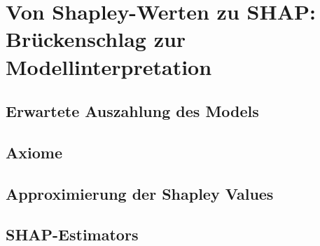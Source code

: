 \chapter{Von Shapley-Werten zu \acs{SHAP}: Brückenschlag zur Modellinterpretation}

\section{Erwartete Auszahlung des Models}
\section{Axiome}
\section{Approximierung der Shapley Values}
\section{\ac{SHAP}-Estimators}